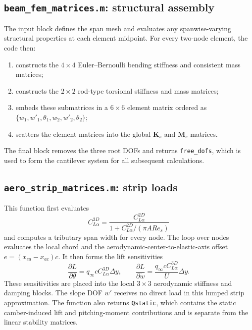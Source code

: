 \documentclass[11pt]{article}
\begin{document}
\subsection{\texttt{beam\_fem\_matrices.m}: structural assembly}

The input block defines the span mesh and evaluates any spanwise-varying structural
properties at each element midpoint. For every two-node element, the code then:
\begin{enumerate}
\item constructs the $4\times4$ Euler--Bernoulli bending stiffness and consistent mass
matrices;
\item constructs the $2\times2$ rod-type torsional stiffness and mass matrices;
\item embeds these submatrices in a $6\times6$ element matrix ordered as
 $\{w_1,w'_1,\theta_1,w_2,w'_2,\theta_2\}$;
\item scatters the element matrices into the global $\bm K_s$ and $\bm M_s$ matrices.
\end{enumerate}
The final block removes the three root DOFs and returns \texttt{free\_dofs}, which is
used to form the cantilever system for all subsequent calculations.

\subsection{\texttt{aero\_strip\_matrices.m}: strip loads}

This function first evaluates
\begin{equation}
 C_{L\alpha}^{3D}
 =
 \frac{C_{L\alpha}^{2D}}
 {1+C_{L\alpha}^{2D}/(\pi AR e_s)}
\end{equation}
and computes a tributary span width for every node. The loop over nodes evaluates the
local chord and the aerodynamic-center-to-elastic-axis offset
$e=(x_{ea}-x_{ac})c$. It then forms the lift sensitivities
\begin{equation}
 \frac{\partial L}{\partial\theta}
 =q_\infty c C_{L\alpha}^{3D}\Delta y,\qquad
 \frac{\partial L}{\partial\dot w}
 =\frac{q_\infty c C_{L\alpha}^{3D}}{U}\Delta y.
\end{equation}
These sensitivities are placed into the local $3\times3$ aerodynamic stiffness and
damping blocks. The slope DOF $w'$ receives no direct load in this lumped strip
approximation. The function also returns \texttt{Qstatic}, which contains the static
camber-induced lift and pitching-moment contributions and is separate from the linear
stability matrices.
\end{document}
